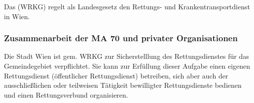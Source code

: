 
Das  (WRKG)
regelt als Landesgesetz den Rettungs- und
Krankentransportdienst in Wien.



\subsubsection{Zusammenarbeit der MA 70 und privater
Organisationen}

Die Stadt Wien ist gem. WRKG zur Sicherstelllung des
Rettungsdienstes für das Gemeindegebiet verpflichtet. Sie
kann zur Erfüllung dieser Aufgabe einen eigenen
Rettungsdienst (öffentlicher Rettungsdienst) betreiben, sich
aber auch der ausschließlichen oder teilweisen Tätigkeit
bewilligter Rettungsdienste bedienen und einen
Rettungsverbund organisieren. 

